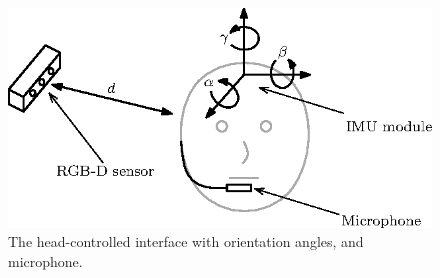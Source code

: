 \documentclass[journal,twoside]{IEEEtran}
\theoremstyle{definition}
\begin{document}
\begin{figure}[t]
\centering
\includegraphics[scale = 1]{fig10}
\caption{The head-controlled interface with orientation angles, and microphone.}
\label{fig:imu_head}
\end{figure}
\end{document}
